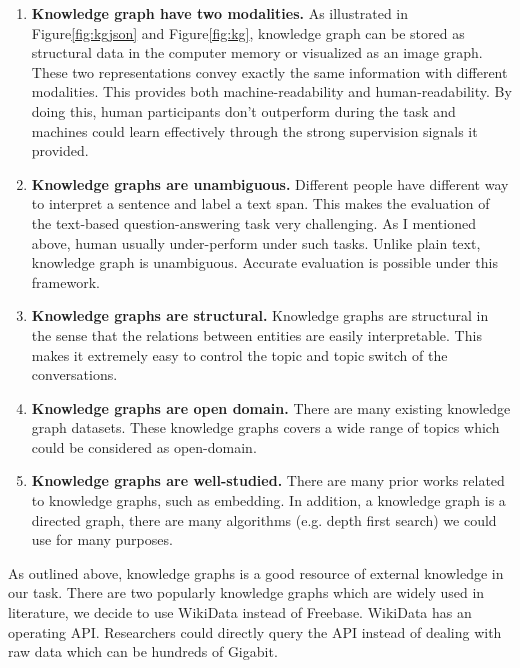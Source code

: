 \documentclass[bsc,frontabs,twoside,singlespacing,parskip,deptreport]{infthesis}     %
\begin{document}
\begin{enumerate}
   \item \textbf{Knowledge graph have two modalities.} 
   As illustrated in Figure\ref{fig:kgjson} and Figure\ref{fig:kg}, knowledge graph can be stored as structural data in the computer memory or visualized as an image graph. These two representations convey exactly the same information with different modalities. This provides both machine-readability and human-readability. By doing this, human participants don't outperform during the task and machines could learn effectively through the strong supervision signals it provided.
   
   \item \textbf{Knowledge graphs are unambiguous.} Different people have different way to interpret a sentence and label a text span. This makes the evaluation of the text-based question-answering task very challenging. As I mentioned above, human usually under-perform under such tasks. Unlike plain text, knowledge graph is unambiguous. Accurate evaluation is possible under this framework.
   
   \item  \textbf{Knowledge graphs are structural.} Knowledge graphs are structural in the sense that the relations between entities are easily interpretable. This makes it extremely easy to control the topic and topic switch of the conversations.
   
    \item \textbf{Knowledge graphs are open domain.} There are many existing knowledge graph datasets\cite{vrandevcic2014wikidata,bollacker2008freebase}. These knowledge graphs covers a wide range of topics which could be considered as open-domain.
    
    \item \textbf{Knowledge graphs are well-studied.} There are many prior works related to knowledge graphs, such as embedding\cite{lin2015learning}. In addition, a knowledge graph is a directed graph, there are many algorithms (e.g. depth first search) we could use for many purposes.
    

\end{enumerate}


As outlined above, knowledge graphs  is a good resource of external knowledge in our task. There are two popularly knowledge graphs which are widely used in literature, we decide to use WikiData\cite{vrandevcic2014wikidata} instead of Freebase\cite{bollacker2008freebase}. WikiData has an operating API. Researchers could directly query the API instead of dealing with raw data which can be hundreds of Gigabit.
\end{document}

